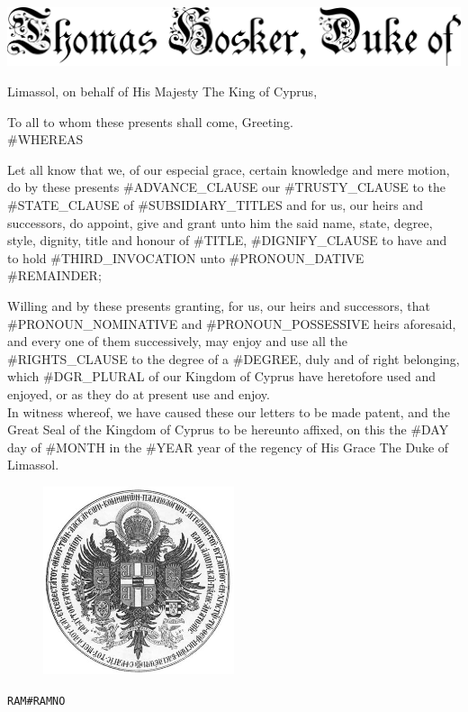 \documentclass[varwidth=true,border=50pt]{standalone}
\begin{document}
\thispagestyle{fancy}

\noindent \includegraphics[width=\textwidth]{thomas_hosker_duke_of}

{\LARGE
Limassol, on behalf of His Majesty The King of Cyprus,

\hspace{20pt} To all to whom these presents shall come, Greeting.\\

#WHEREAS

\hspace{20pt} Let all know that we, of our especial grace, certain knowledge and mere motion, do by these presents #ADVANCE_CLAUSE our #TRUSTY_CLAUSE \hspace{7pt}{\hoskeroe #GRANTEE}\hspace{7pt} to the #STATE_CLAUSE of \hspace{7pt}{\hoskeroe #TITLE}\hspace{7pt} #SUBSIDIARY_TITLES and for us, our heirs and successors, do appoint, give and grant unto him the said name, state, degree, style, dignity, title and honour of #TITLE, #DIGNIFY_CLAUSE to have and to hold #THIRD_INVOCATION unto #PRONOUN_DATIVE #REMAINDER;

\hspace{20pt} Willing and by these presents granting, for us, our heirs and successors, that #PRONOUN_NOMINATIVE and #PRONOUN_POSSESSIVE heirs aforesaid, and every one of them successively, may enjoy and use all the #RIGHTS_CLAUSE to the degree of a #DEGREE, duly and of right belonging, which #DGR_PLURAL of our Kingdom of Cyprus have heretofore used and enjoyed, or as they do at present use and enjoy.\\

\hspace{20pt} In witness whereof, we have caused these our letters to be made patent, and the Great Seal of the Kingdom of Cyprus to be hereunto affixed, on this the #DAY day of #MONTH in the #YEAR year of the regency of His Grace The Duke of Limassol.
}

\begin{figure}[h]
\centering
\includegraphics[width=0.5\textwidth]{seal}
\end{figure}

\hfill {\footnotesize \texttt{RAM{#RAMNO}}}
\end{document}
